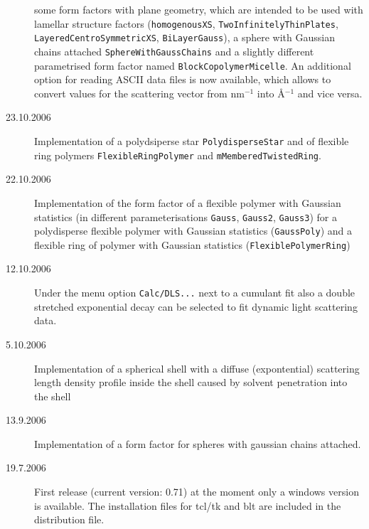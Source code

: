 \begin{description}
    some form factors with plane geometry, which are intended to be used with lamellar structure factors
    (\texttt{homogenousXS}, \texttt{TwoInfinitelyThinPlates},
     \texttt{LayeredCentroSymmetricXS}, \texttt{BiLayerGauss}), a sphere with Gaussian chains attached
    \texttt{SphereWithGaussChains} and a slightly different parametrised form factor named
    \texttt{BlockCopolymerMicelle}.
    An additional option for reading ASCII data files is now available,
    which allows to convert values for the scattering vector from
    nm$^{-1}$ into \AA$^{-1}$ and vice versa. \sloppy
    \item[23.10.2006] Implementation of a polydsiperse star \texttt{PolydisperseStar} and
    of flexible ring polymers \texttt{FlexibleRingPolymer} and \texttt{mMemberedTwistedRing}.
    \item[22.10.2006] Implementation of the form factor of a flexible polymer with Gaussian statistics
    (in different parameterisations \verb"Gauss", \verb"Gauss2", \verb"Gauss3") for a polydisperse flexible
    polymer with Gaussian statistics (\verb"GaussPoly") and a flexible ring of polymer with Gaussian statistics
    (\verb"FlexiblePolymerRing")
    \item[12.10.2006] Under the menu option \verb"Calc/DLS..." next to a cumulant fit also
      a double stretched exponential decay can be selected to fit dynamic light scattering data.
    \item[5.10.2006] Implementation of a spherical shell with a diffuse
      (expontential) scattering length density profile inside the shell
      caused by solvent penetration into the shell
    \item[13.9.2006] Implementation of a form factor for spheres
      with gaussian chains attached.
    \item[19.7.2006] First release (current version: 0.71)
      at the moment only a windows version is available. The
      installation files for tcl/tk and blt are included in the
      distribution file.
\end{description}
